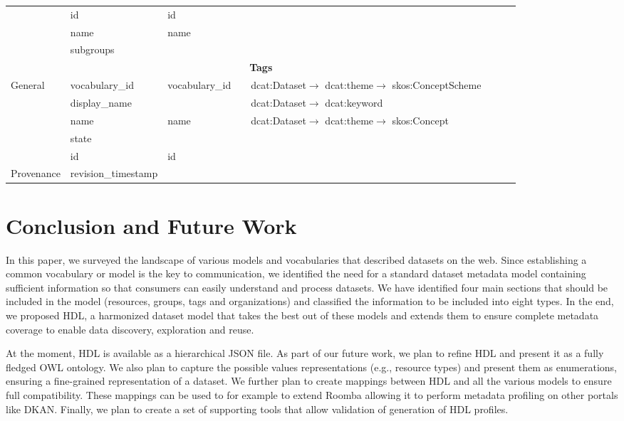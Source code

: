 \documentclass[runningheads,a4paper]{llncs}
\begin{document}
{\begin{landscape}
{\begin{longtable}{|p{1cm}|m{2.9cm}|m{2.4cm}|m{2.6cm}|p{3.8cm}|m{3.8cm}|m{6.5cm}|m{2.5cm}|}
\cline{2-8}
 & id & id &  &  &  &  & \tabularnewline
\cline{2-8}
 & name & name &  &  &  &  & \tabularnewline
\cline{2-8}
 & subgroups &  &  &  &  &  & \tabularnewline
\hline
\multicolumn{8}{|c|}{\cellcolor{blue!25}\textbf{Tags}}\tabularnewline
\hline
\multirow{5}{2cm}{General} & vocabulary\_id & vocabulary\_id &  & dcat:Dataset$\rightarrow$ dcat:theme$\rightarrow$ skos:ConceptScheme &  &  & \tabularnewline
\cline{2-8}
 & display\_name &  &  & dcat:Dataset$\rightarrow$ dcat:keyword &  &  & \tabularnewline
\cline{2-8}
 & name & name &  & dcat:Dataset$\rightarrow$ dcat:theme$\rightarrow$ skos:Concept &  &  & \tabularnewline
\cline{2-8}
 & state &  &  &  &  &  & \tabularnewline
\cline{2-8}
 & id & id &  &  &  &  & \tabularnewline
\hline
Provenance & revision\_timestamp &  &  &  &  &  & \tabularnewline
\hline
\end{longtable}
}
\end{landscape}
\clearpage
\restoregeometry
}


\section{Conclusion and Future Work}
\label{sec:conclusion}

In this paper, we surveyed the landscape of various models and vocabularies that described datasets on the web. Since establishing a common vocabulary or model is the key to communication, we identified the need for a standard dataset metadata model containing sufficient information so that consumers can easily understand and process datasets. We have identified four main sections that should be included in the model (resources, groups, tags and organizations) and classified the information to be included into eight types. In the end, we proposed HDL, a harmonized dataset model that takes the best out of these models and extends them to ensure complete metadata coverage to enable data discovery, exploration and reuse.

At the moment, HDL is available as a hierarchical JSON file. As part of our future work, we plan to refine HDL and present it as a fully fledged OWL ontology. We also plan to capture the possible values representations (e.g., resource types) and present them as enumerations, ensuring a fine-grained representation of a dataset. We further plan to create mappings between HDL and all the various models to ensure full compatibility. These mappings can be used to for example to extend Roomba allowing it to perform metadata profiling on other portals like DKAN. Finally, we plan to create a set of supporting tools that allow validation of generation of HDL profiles.
\end{document}
